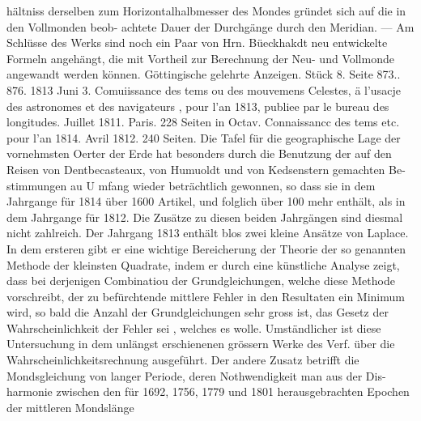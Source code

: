 \documentclass[12pt,a4paper]{article}
\begin{document}
hältniss derselben zum Horizontalhalbmesser des Mondes gründet sich auf die in den Vollmonden beob-\newline
achtete Dauer der Durchgänge durch den Meridian. --- Am Schlüsse des Werks sind noch ein Paar von\newline
Hrn. Büeckhakdt neu entwickelte Formeln angehängt, die mit Vortheil zur Berechnung der Neu- und\newline
Vollmonde angewandt werden können.\newline
Göttingische gelehrte Anzeigen. Stück 8. Seite 873.. 876. 1813 Juni 3.\newline
Comuiissance des tems ou des mouvemens Celestes, ä l'usacje des astronomes et des navigateurs , pour\newline
l'an 1813, publiee par le bureau des longitudes. Juillet 1811. Paris. 228 Seiten in Octav.\newline
Connaissancc des tems etc. pour l'an 1814. Avril 1812. 240 Seiten.\newline
Die Tafel für die geographische Lage der vornehmsten Oerter der Erde hat besonders durch die\newline
Benutzung der auf den Reisen von Dentbecasteaux, von Humuoldt und von Kedsenstern gemachten Be-\newline
stimmungen au U mfang wieder beträchtlich gewonnen, so dass sie in dem Jahrgange für 1814 über 1600\newline
Artikel, und folglich über 100 mehr enthält, als in dem Jahrgange für 1812. Die Zusätze zu diesen\newline
beiden Jahrgängen sind diesmal nicht zahlreich. Der Jahrgang 1813 enthält blos zwei kleine Ansätze\newline
von Laplace. In dem ersteren gibt er eine wichtige Bereicherung der Theorie der so genannten Methode\newline
der kleinsten Quadrate, indem er durch eine künstliche Analyse zeigt, dass bei derjenigen Combinatiou\newline
der Grundgleichungen, welche diese Methode vorschreibt, der zu befürchtende mittlere Fehler in den\newline
Resultaten ein Minimum wird, so bald die Anzahl der Grundgleichungen sehr gross ist, das Gesetz der\newline
Wahrscheinlichkeit der Fehler sei , welches es wolle. Umständlicher ist diese Untersuchung in dem\newline
unlängst erschienenen grössern Werke des Verf. über die Wahrscheinlichkeitsrechnung ausgeführt. Der\newline
andere Zusatz betrifft die Mondsgleichung von langer Periode, deren Nothwendigkeit man aus der Dis-\newline
harmonie zwischen den für 1692, 1756, 1779 und 1801 herausgebrachten Epochen der mittleren Mondslänge\newline
\end{document}
